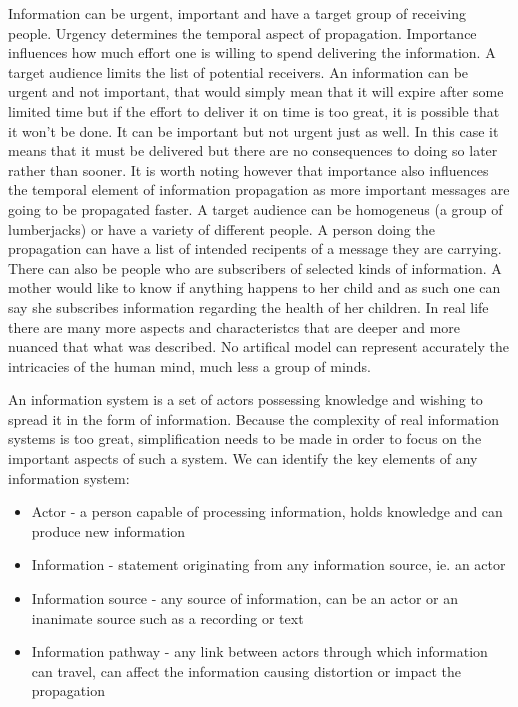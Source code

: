 Information can be urgent, important and have a target group of receiving people.
Urgency determines the temporal aspect of propagation.
Importance influences how much effort one is willing to spend delivering the information.
A target audience limits the list of potential receivers.
An information can be urgent and not important, that would simply mean that it will expire after some limited time but if the effort to deliver it on time is too great, it is possible that it won't be done.
It can be important but not urgent just as well.
In this case it means that it must be delivered but there are no consequences to doing so later rather than sooner.
It is worth noting however that importance also influences the temporal element of information propagation as more important messages are going to be propagated faster.
A target audience can be homogeneus (a group of lumberjacks) or have a variety of different people.
A person doing the propagation can have a list of intended recipents of a message they are carrying.
There can also be people who are subscribers of selected kinds of information.
A mother would like to know if anything happens to her child and as such one can say she subscribes information regarding the health of her children.
In real life there are many more aspects and characteristcs that are deeper and more nuanced that what was described.
No artifical model can represent accurately the intricacies of the human mind, much less a group of minds.

An information system is a set of actors possessing knowledge and wishing to spread it in the form of information.
Because the complexity of real information systems is too great, simplification needs to be made in order to focus on the important aspects of such a system.
We can identify the key elements of any information system:
\begin{itemize}
    \item Actor - a person capable of processing information, holds knowledge and can produce new information
    \item Information - statement originating from any information source, ie. an actor
    \item Information source - any source of information, can be an actor or an inanimate source such as a recording or text
    \item Information pathway - any link between actors through which information can travel, can affect the information causing distortion or impact the propagation
\end{itemize}